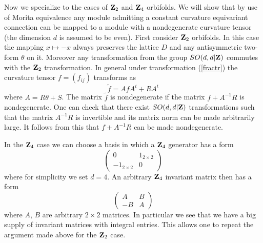 \documentclass[a4paper,a4paper]{article}
\begin{document}
{%
Now we specialize to the cases of ${\bf Z}_{2}$ and ${\bf Z}_{4}$ orbifolds. 
We will show that by  use of Morita equivalence any module admitting a 
constant curvature equivariant connection can be mapped to a module with a nondegenerate 
curvature tensor (the dimension $d$  is assumed to be even).
First consider ${\bf Z}_{2}$ orbifolds. 
In this case the mapping $x \mapsto -x$ always preserves the lattice $D$ and any antisymmetric 
two-form $\theta$ on it. Moreover any transformation from the group $SO(d,d|{\bf Z})$ 
commutes with the ${\bf Z}_{2}$ transformation. In general under transformation (\ref{fractr}) 
the curvature tensor $f = (f_{ij})$ transforms as 
\begin{equation}
\tilde f = AfA^{t} + RA^{t}
\end{equation}
where $A = R\theta + S$. The matrix $\tilde f$ is  nondegenerate if the matrix 
$f + A^{-1}R$ is nondegenerate. One can check that there exist $SO(d,d |{\bf Z})$ transformations 
such that the matrix $A^{-1}R$ is invertible and its matrix norm can be made arbitrarily large. 
It follows from this  that $f + A^{-1}R$ can be made nondegenerate. 


In the ${\bf Z}_{4}$ case  we can choose a basis in which a ${\bf Z}_{4}$ generator has a form
$$
\left(
\begin{array}{cc}
0&  1_{2\times 2} \\
-1_{2\times 2} & 0
\end{array} \right)
$$
where for simplicity we set  $d=4$. An arbitrary ${\bf Z}_{4}$ invariant matrix then has a form 
$$
\left( \begin{array}{cc}
A& B \\
-B&A
\end{array} \right)
$$  
where $A$, $B$ are arbitrary $2\times 2$ matrices. In particular we see that we 
have a big supply of invariant matrices with integral entries. This allows one to repeat 
the argument made above for the ${\bf Z}_{2}$ case.




}
\end{document}
